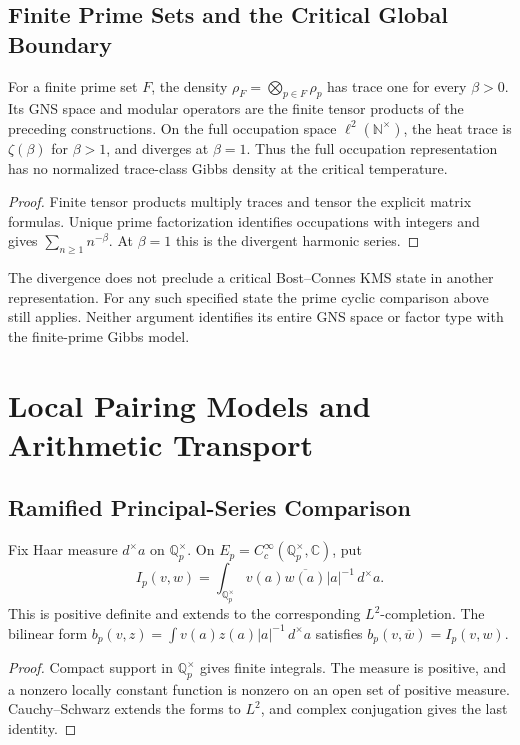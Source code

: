 \subsection{Finite Prime Sets and the Critical Global Boundary}
\label{v4-arith:kms-gns:cycle1:adelic}
\begin{corollary}
\label{v4-arith:kms-gns:cor:adelic-KMS-GNS}
For a finite prime set \(F\), the density
\(\rho_F=\bigotimes_{p\in F}\rho_p\) has trace one for every
\(\beta>0\). Its GNS space and modular operators are the finite
tensor products of the preceding constructions. On the full
occupation space \(\ell^2(\mathbb N^{\times})\), the heat trace is
\(\zeta(\beta)\) for \(\beta>1\), and diverges at \(\beta=1\).
Thus the full occupation representation has no normalized
trace-class Gibbs density at the critical temperature.
\end{corollary}
\begin{proof}
Finite tensor products multiply traces and tensor the explicit
matrix formulas. Unique prime factorization identifies occupations
with integers and gives \(\sum_{n\geq1}n^{-\beta}\). At
\(\beta=1\) this is the divergent harmonic series.
\end{proof}
The divergence does not preclude a critical Bost--Connes KMS state
in another representation. For any such specified state the
prime cyclic comparison above still applies. Neither argument
identifies its entire GNS space or factor type with the finite-prime
Gibbs model.

\section{Local Pairing Models and Arithmetic Transport}
\label{v4-arith:kms-gns:cycle2}
\subsection{Ramified Principal-Series Comparison}
\label{v4-arith:kms-gns:cycle2:ramified}

\begin{lemma}
\label{v4-arith:kms-gns:lem:GJ-ramified}
Fix Haar measure \(d^\times a\) on \(\mathbb Q_p^\times\).
On \(E_p=C_c^\infty(\mathbb Q_p^\times,\mathbb C)\), put
\begin{equation}
\label{v4-arith:kms-gns:eq:GJ-ramified}
 I_p(v,w)=\int_{\mathbb Q_p^\times}v(a)\overline{w(a)}
 |a|^{-1}\,d^\times a.
\end{equation}
This is positive definite and extends to the corresponding
\(L^2\)-completion. The bilinear form
\(b_p(v,z)=\int v(a)z(a)|a|^{-1}\,d^\times a\) satisfies
\(b_p(v,\overline w)=I_p(v,w)\).
\end{lemma}
\begin{proof}
Compact support in \(\mathbb Q_p^\times\) gives finite integrals.
The measure is positive, and a nonzero locally constant function
is nonzero on an open set of positive measure. Cauchy--Schwarz
extends the forms to \(L^2\), and complex conjugation gives the
last identity.
\end{proof}

